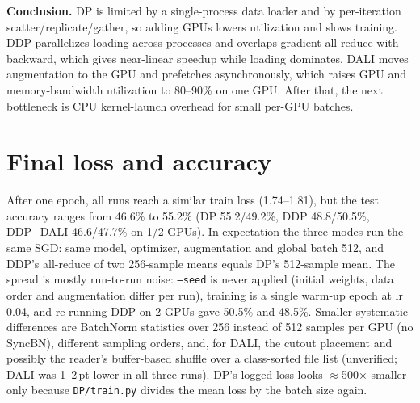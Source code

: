 \documentclass[11pt,a4paper]{article}
\begin{document}
\textbf{Conclusion.} DP is limited by a single-process data loader and by per-iteration scatter/replicate/gather, so adding GPUs lowers
utilization and slows training. DDP parallelizes loading across processes and overlaps gradient all-reduce with backward, which gives near-linear speedup
while loading dominates. DALI moves augmentation to the GPU and prefetches asynchronously, which raises GPU and memory-bandwidth utilization to 80--90\%
on one GPU. After that, the next bottleneck is CPU kernel-launch overhead for small per-GPU batches.

\section{Final loss and accuracy}

After one epoch, all runs reach a similar train loss (1.74--1.81), but the test accuracy ranges from 46.6\% to 55.2\%
(DP 55.2/49.2\%, DDP 48.8/50.5\%, DDP+DALI 46.6/47.7\% on 1/2 GPUs). In expectation the three modes run the same SGD:
same model, optimizer, augmentation and global batch 512, and DDP's all-reduce of two 256-sample means equals DP's 512-sample mean.
The spread is mostly run-to-run noise: \texttt{--seed} is never applied (initial weights, data order and augmentation differ per run),
training is a single warm-up epoch at lr 0.04, and re-running DDP on 2 GPUs gave 50.5\% and 48.5\%. Smaller systematic
differences are BatchNorm statistics over 256 instead of 512 samples per GPU (no SyncBN), different sampling orders, and, for DALI, the
cutout placement and possibly the reader's buffer-based shuffle over a class-sorted file list (unverified; DALI was 1--2\,pt lower in all
three runs). DP's logged loss looks $\approx$500$\times$ smaller only because \texttt{DP/train.py} divides the mean loss by the batch size again.
\end{document}
